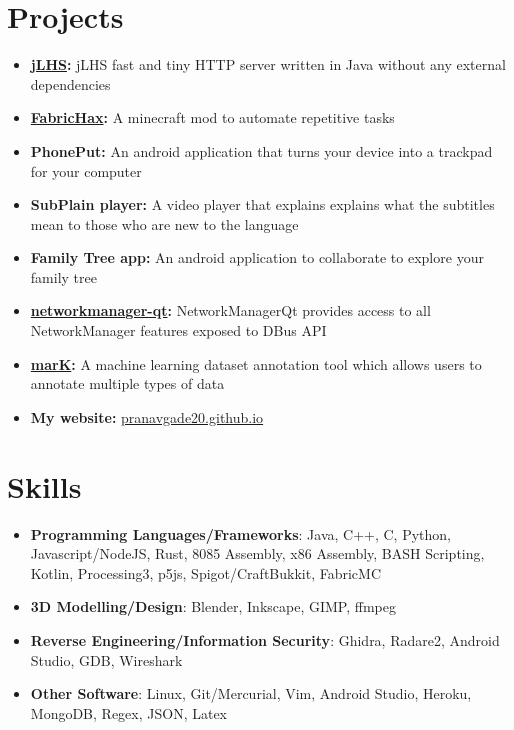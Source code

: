 \documentclass[letterpaper,11pt]{article}
\newcommand{\orignalResumeItem}[2]{
  \item\small{
    \textbf{#1}{ #2 \vspace{-2pt}}
  }
}
\newcommand{\resumeSubItem}[2]{\orignalResumeItem{#1}{#2}\vspace{-4pt}}
\newcommand{\resumeSubHeadingListStart}{\begin{itemize}[leftmargin=*]}
\newcommand{\resumeSubHeadingListEnd}{\end{itemize}}
\begin{document}
\section{Projects}
  \resumeSubHeadingListStart
    \resumeSubItem{\href{https://github.com/pranavgade20/jLHS}{jLHS}:}
      {\vspace{-2pt}  jLHS fast and tiny HTTP server written in Java without any external dependencies}
    \resumeSubItem{\href{https://github.com/pranavgade20/jLHS}{FabricHax}:}
	  {\vspace{-2pt}  A minecraft mod to automate repetitive tasks}
    \resumeSubItem{PhonePut:}
      {\vspace{-2pt} An android application that turns your device into a trackpad for your computer}
    \resumeSubItem{SubPlain player:}
      {\vspace{-2pt} A video player that explains explains what the subtitles mean to those who are new to the language}
    \resumeSubItem{Family Tree app:}
      {\vspace{-2pt} An android application to collaborate to explore your family tree}
    \resumeSubItem{\href{https://phabricator.kde.org/source/networkmanager-qt/}{networkmanager-qt}:}
      {\vspace{-2pt} NetworkManagerQt provides access to all NetworkManager features exposed to DBus API}
   \resumeSubItem{\href{https://invent.kde.org/education/mark}{marK}:}
      {\vspace{-2pt} A machine learning dataset annotation tool which allows users to annotate multiple types of data}
    \resumeSubItem{My website:}
      {\vspace{-2pt} \href{http://pranavgade20.github.io/}{pranavgade20.github.io}}
  \resumeSubHeadingListEnd


\section{Skills}
 \resumeSubHeadingListStart
   \item{
     \textbf{Programming Languages/Frameworks}{: Java, C++, C, Python, Javascript/NodeJS, Rust, 8085 Assembly, x86 Assembly, BASH Scripting, Kotlin, Processing3, p5js, Spigot/CraftBukkit, FabricMC}
   }
    \item{
      \vspace{-8pt}
      \textbf{3D Modelling/Design}{: Blender, Inkscape, GIMP, ffmpeg}
    }
    \item{
      \vspace{-8pt}
      \textbf{Reverse Engineering/Information Security}{: Ghidra, Radare2, Android Studio, GDB, Wireshark}
    }
    \item{
      \vspace{-8pt}
      \textbf{Other Software}{: Linux, Git/Mercurial, Vim, Android Studio, Heroku, MongoDB, Regex, JSON, Latex}
    }

 \resumeSubHeadingListEnd


\end{document}
